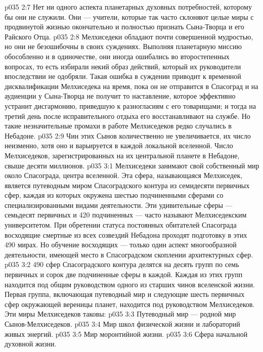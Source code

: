 \vs p035 2:7 Нет ни одного аспекта планетарных духовных потребностей, которому бы они не служили. Они --- учители, которые так часто склоняют целые миры с продвинутой жизнью окончательно и полностью признать Сына\hyp{}Творца и его Райского Отца.
\vs p035 2:8 \pc Мелхиседеки обладают почти совершенной мудростью, но они не безошибочны в своих суждениях. Выполняя планетарную миссию обособленно и в одиночестве, они иногда ошибались во второстепенных вопросах, то есть избирали некий образ действий, который их руководители впоследствии не одобряли. Такая ошибка в суждении приводит к временной дисквалификации Мелхиседека на время, пока он не отправится в Спасоград и на аудиенции у Сына\hyp{}Творца не получит то наставление, которое эффективно устранит дисгармонию, приведшую к разногласиям с его товарищами; и тогда на третий день после исправительного отдыха его восстанавливают на службе. Но такие незначительные промахи в работе Мелхиседеков редко случались в Небадоне.
\vs p035 2:9 Чин этих Сынов количественно не увеличивается, их число неизменно, хотя оно и варьируется в каждой локальной вселенной. Число Мелхиседеков, зарегистрированных на их центральной планете в Небадоне, свыше десяти миллионов.
\vs p035 3:1 Мелхиседеки занимают свой собственный мир около Спасограда, центра вселенной. Эта сфера, называющаяся Мелхиседек, является путеводным миром Спасоградского контура из семидесяти первичных сфер, каждая из которых окружена шестью подчиненными сферами со специализированными видами деятельности. Эти удивительные сферы --- семьдесят первичных и 420 подчиненных --- часто называют Мелхиседекским университетом. При обретении статуса постоянных обитателей Спасограда восходящие смертные из всех созвездий Небадона проходят подготовку в этих 490 мирах. Но обучение восходящих --- только один аспект многообразной деятельности, имеющей место в Спасоградском скоплении архитектурных сфер.
\vs p035 3:2 490 сфер Спасоградского контура делятся на десять групп по семь первичных и сорок две подчиненные сферы в каждой. Каждая из этих групп находится под общим руководством одного из старших чинов вселенской жизни. Первая группа, включающая путеводный мир и следующие шесть первичных сфер окружающей вереницы планет, находится под руководством Мелхиседеков. Эти миры Мелхиседеков таковы:
\vs p035 3:3 \bibnobreakspace Путеводный мир --- родной мир Сынов\hyp{}Мелхиседеков.
\vs p035 3:4 \bibnobreakspace Мир школ физической жизни и лабораторий живых энергий.
\vs p035 3:5 \bibnobreakspace Мир моронтийной жизни.
\vs p035 3:6 \bibnobreakspace Сфера начальной духовной жизни.
